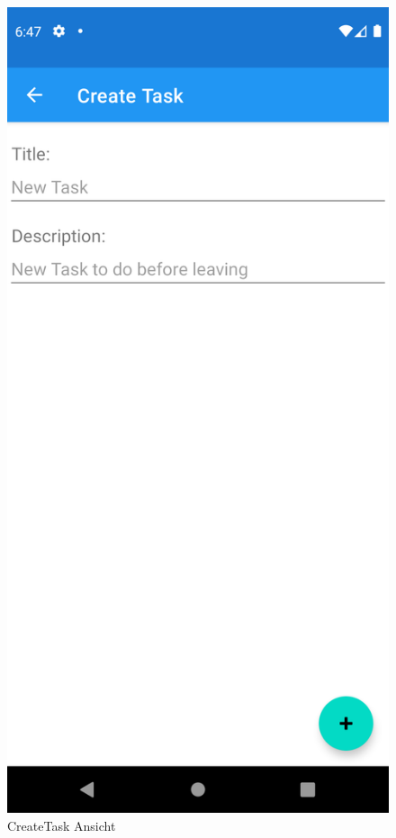 \begin{figure}[h]
	\hfill
	\begin{minipage}{0.45\linewidth}
		\centering
		\includegraphics[width=.9\linewidth]{Bilder/CreateTask.png}
		\caption{CreateTask Ansicht}
		\label{fig:createTask}
	\end{minipage}
\end{figure}
